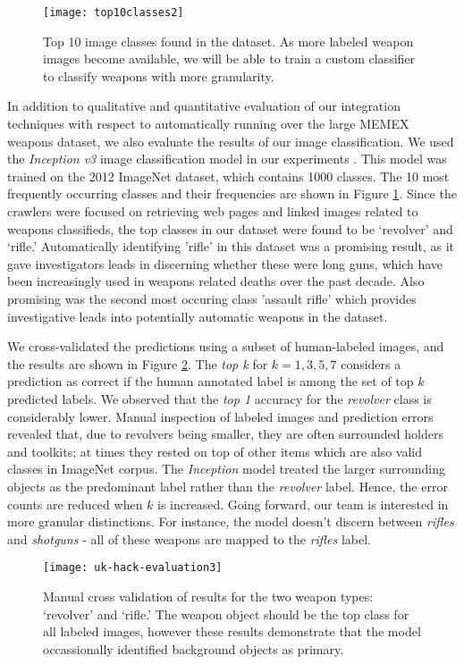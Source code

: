 \begin{figure}
	\texttt{[image: top10classes2]}
	\caption{Top 10 image classes found in the dataset. As more labeled weapon images become available, we will be able to train a custom classifier to classify weapons with more granularity.}
	\label{fig:top10ImgClass}
\end{figure}


In addition to qualitative and quantitative evaluation of our integration techniques with respect to automatically running over the large MEMEX weapons dataset, we also evaluate the results of our image classification.  We used the \textit{Inception v3} image classification model in our experiments \cite{SzegedyVISW15}. This model was trained on the 2012 ImageNet dataset, which contains 1000 classes\cite{ILSVRC15}. The 10 most frequently occurring classes and their frequencies are shown in Figure \ref{fig:top10ImgClass}. Since the crawlers were focused on retrieving web pages and linked images related to weapons classifieds, the top classes in our dataset were found to be `revolver' and `rifle.' Automatically identifying 'rifle' in this dataset was a promising result, as it gave investigators leads in discerning whether these were long guns, which have been increasingly used in weapons related deaths over the past decade. Also promising was the second most occuring class 'assault rifle' which provides investigative leads into potentially automatic weapons in the dataset.

We cross-validated the predictions using a subset of human-labeled images, and the results are shown in Figure \ref{fig:uk-hack-eval}. The \textit{top k} for $k=1,3,5,7$ considers a prediction as correct if the human annotated label is among the set of top $k$  predicted labels. We observed that the \textit{top 1} accuracy for the \textit{revolver} class is considerably lower. Manual inspection of labeled images and prediction errors revealed that, due to revolvers being smaller, they are often surrounded holders and toolkits; at times they rested on top of other items which are also valid classes in ImageNet corpus. The \textit{Inception} model treated the larger surrounding objects as the predominant label rather than the \textit{revolver} label. Hence, the error counts are reduced when $k$ is increased. Going forward, our team is interested in more granular distinctions. For instance, the model doesn't discern between \textit{rifles} and \textit{shotguns} - all of these weapons are mapped to the \textit{rifles} label. 

\begin{figure}
	\texttt{[image: uk-hack-evaluation3]}
	\caption{Manual cross validation of results for the two weapon types: `revolver' and `rifle.' The weapon object should be the top class for all labeled images, however these results demonstrate that the model occassionally identified background objects as primary.}
	\label{fig:uk-hack-eval}
\end{figure}

